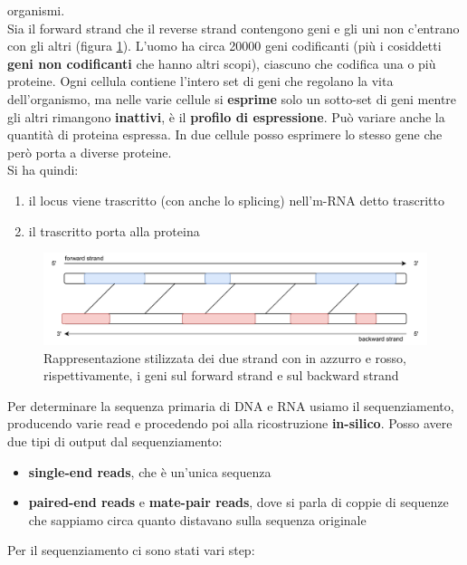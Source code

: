 \documentclass[a4paper,12pt, oneside]{book}
\begin{document}
organismi. \\
Sia il forward strand che il reverse strand contengono geni e gli uni non
c'entrano con gli altri (figura \ref{fig:gene}). L'uomo ha circa 20000 geni
codificanti (più i cosiddetti \textbf{geni non codificanti} che hanno altri
scopi), ciascuno che  
codifica una o più proteine. Ogni cellula contiene l'intero set di geni che
regolano la vita dell'organismo, ma nelle varie cellule si \textbf{esprime} solo
un sotto-set di geni mentre gli altri rimangono \textbf{inattivi}, è il
\textbf{profilo di espressione}. Può variare anche la quantità di proteina
espressa. In due cellule posso esprimere lo stesso gene che però porta a diverse
proteine. \\
Si ha quindi:
\begin{enumerate}
  \item il locus viene trascritto (con anche lo splicing) nell'm-RNA detto
  trascritto
  \item il trascritto porta alla proteina
\end{enumerate}
  \begin{figure}
    \centering
    \includegraphics[width=\textwidth]{img/gene.pdf}
    \caption{Rappresentazione stilizzata dei due strand con in azzurro e rosso,
      rispettivamente, i geni sul forward strand e sul backward strand}
    \label{fig:gene}
  \end{figure}
Per determinare la sequenza primaria di DNA e RNA usiamo il sequenziamento,
producendo varie read e procedendo poi alla ricostruzione
\textbf{in-silico}. Posso avere due tipi di output dal sequenziamento:
\begin{itemize}
  \item \textbf{single-end reads}, che è un'unica sequenza
  \item \textbf{paired-end reads} e \textbf{mate-pair reads}, dove si parla di
  coppie di sequenze che sappiamo circa quanto distavano sulla sequenza
  originale 
\end{itemize}
Per il sequenziamento ci sono stati vari step:
\end{document}
